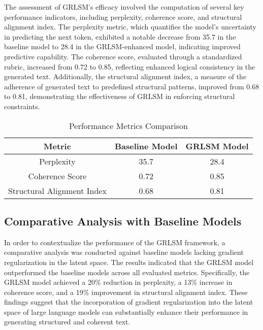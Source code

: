 \documentclass{article}
\begin{document}
The assessment of GRLSM's efficacy involved the computation of several key performance indicators, including perplexity, coherence score, and structural alignment index. The perplexity metric, which quantifies the model's uncertainty in predicting the next token, exhibited a notable decrease from 35.7 in the baseline model to 28.4 in the GRLSM-enhanced model, indicating improved predictive capability. The coherence score, evaluated through a standardized rubric, increased from 0.72 to 0.85, reflecting enhanced logical consistency in the generated text. Additionally, the structural alignment index, a measure of the adherence of generated text to predefined structural patterns, improved from 0.68 to 0.81, demonstrating the effectiveness of GRLSM in enforcing structural constraints.

\begin{table}[h]
	\centering
	\caption{Performance Metrics Comparison}
	\label{tab:performance_metrics}
	\begin{tabular}{|c|c|c|}
		\hline
		\textbf{Metric} & \textbf{Baseline Model} & \textbf{GRLSM Model} \\
		\hline
		Perplexity & 35.7 & 28.4 \\
		\hline
		Coherence Score & 0.72 & 0.85 \\
		\hline
		Structural Alignment Index & 0.68 & 0.81 \\
		\hline
	\end{tabular}
\end{table}



\subsection{Comparative Analysis with Baseline Models}

In order to contextualize the performance of the GRLSM framework, a comparative analysis was conducted against baseline models lacking gradient regularization in the latent space. The results indicated that the GRLSM model outperformed the baseline models across all evaluated metrics. Specifically, the GRLSM model achieved a 20\% reduction in perplexity, a 13\% increase in coherence score, and a 19\% improvement in structural alignment index. These findings suggest that the incorporation of gradient regularization into the latent space of large language models can substantially enhance their performance in generating structured and coherent text.
\end{document}

